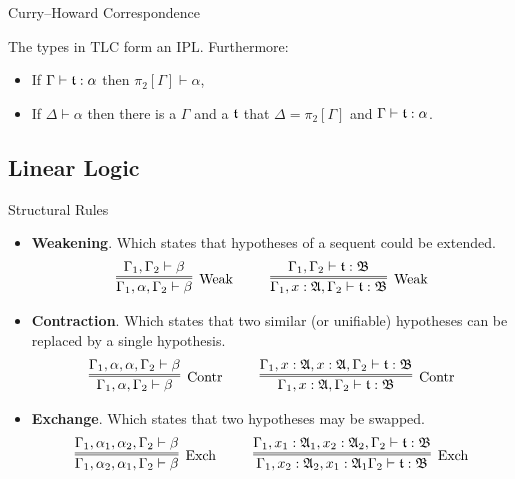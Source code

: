 \begin{frame}{Curry--Howard Correspondence}
\begin{theorem}
The types in $\mathrm{TLC}$ form an $\mathrm{IPL}$. Furthermore:
\begin{itemize}
    \item If $\Gamma \vdash \mathfrak{t} : \alpha$ then $\pi_2[\Gamma] \vdash \alpha$,
    \item If $\Delta \vdash \alpha$ then there is a $\Gamma$ and a $\mathfrak{t}$ that $\Delta = \pi_2[\Gamma]$ and $\Gamma \vdash \mathfrak{t} : \alpha$.
\end{itemize}
\end{theorem}
\end{frame}

\subsection{Linear Logic}

\begin{frame}{Structural Rules}
    \begin{itemize}
        \item \textbf{Weakening}. Which states that hypotheses of a sequent could be extended.
        \begin{gather*}
            \infer=[\mbox{Weak}]{\Gamma_1, \alpha, \Gamma_2 \vdash \beta}{\Gamma_1, \Gamma_2 \vdash \beta}
            ~~~~ ~~~~
            \infer=[\mbox{Weak}]{\Gamma_1, x : \A, \Gamma_2\vdash \t : \mathfrak{B}}{\Gamma_1, \Gamma_2\vdash \t : \mathfrak{B}}
        \end{gather*}
        \item \textbf{Contraction}. Which states that two similar (or unifiable) hypotheses can be replaced by a single hypothesis.
        \begin{gather*}
            \infer=[\mbox{Contr}]{\Gamma_1, \alpha, \Gamma_2 \vdash \beta}{\Gamma_1, \alpha, \alpha, \Gamma_2 \vdash \beta}
            ~~~~ ~~~~
            \infer=[\mbox{Contr}]{\Gamma_1, x : \A, \Gamma_2 \vdash \t : \mathfrak{B}}{\Gamma_1, x : \A, x : \A, \Gamma_2 \vdash \t : \mathfrak{B}}
        \end{gather*}
        \item \textbf{Exchange}. Which states that two hypotheses may be swapped.
        \begin{gather*}
            \infer=[\mbox{Exch}]{\Gamma_1, \alpha_2, \alpha_1, \Gamma_2 \vdash \beta}{\Gamma_1, \alpha_1, \alpha_2, \Gamma_2 \vdash \beta}
            ~~~~ ~~~~
            \infer=[\mbox{Exch}]{\Gamma_1, x_2 : \A_2, x_1 : \A_1 \Gamma_2 \vdash \t : \mathfrak{B}}{\Gamma_1, x_1 : \A_1, x_2 : \A_2, \Gamma_2 \vdash \t : \mathfrak{B}}
        \end{gather*}
    \end{itemize}
\end{frame}

